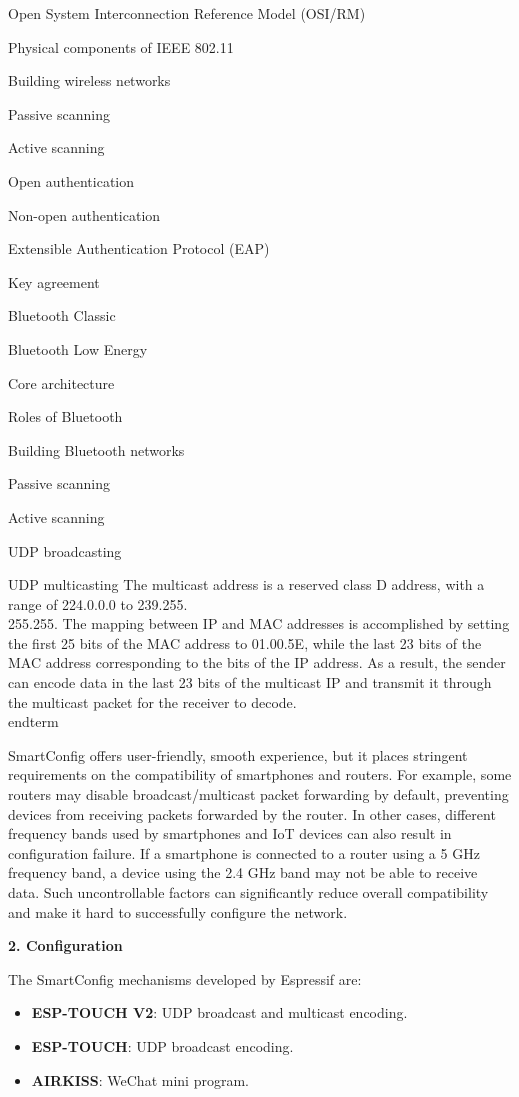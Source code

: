 \documentclass[a4paper,12pt]{book}
\begin{document}
\begin{term}{Open System Interconnection Reference Model (OSI/RM)}
\begin{term}{Physical components of IEEE 802.11}
\begin{term}{Building wireless networks}
\begin{term}{Passive scanning}
\begin{term}{Active scanning}
\begin{term}{Open authentication}
\begin{term}{Non-open authentication}
\begin{term}{Extensible Authentication Protocol (EAP)}
\begin{term}{Key agreement}
\begin{term}{Bluetooth Classic}
\begin{term}{Bluetooth Low Energy}
\begin{term}{Core architecture}
\begin{term}{Roles of Bluetooth}
\begin{term}{Building Bluetooth networks}
\begin{term}{Passive scanning}
\begin{term}{Active scanning}
\begin{term}{UDP broadcasting}
\begin{term}{UDP multicasting}
    The multicast address is a reserved class D address, with a range of 224.0.0.0 to 239.255.\\255.255. The mapping between IP and MAC addresses is accomplished by setting the first 25 bits of the MAC address to 01.00.5E, while the last 23 bits of the MAC address corresponding to the bits of the IP address. As a result, the sender can encode data in the last 23 bits of the multicast IP and transmit it through the multicast packet for the receiver to decode.
\\end{term}{}

SmartConfig offers user-friendly, smooth experience, but it places stringent requirements on the compatibility of smartphones and routers. For example, some routers may disable broadcast/multicast packet forwarding by default, preventing devices from receiving packets forwarded by the router. In other cases, different frequency bands used by smartphones and IoT devices can also result in configuration failure. If a smartphone is connected to a router using a 5 GHz frequency band, a device using the 2.4 GHz band may not be able to receive data. Such uncontrollable factors can significantly reduce overall compatibility and make it hard to successfully configure the network.

\textbf{2. Configuration}

The SmartConfig mechanisms developed by Espressif are:

\begin{itemize}
    \item \textbf{ESP-TOUCH V2}: UDP broadcast and multicast encoding.
    \parskip 0pt
    \item \textbf{ESP-TOUCH}: UDP broadcast encoding.
    \item \textbf{AIRKISS}: WeChat mini program.
\end{itemize}



\end{term}
\end{term}
\end{term}
\end{term}
\end{term}
\end{term}
\end{term}
\end{term}
\end{term}
\end{term}
\end{term}
\end{term}
\end{term}
\end{term}
\end{term}
\end{term}
\end{term}
\end{term}
\end{document}
